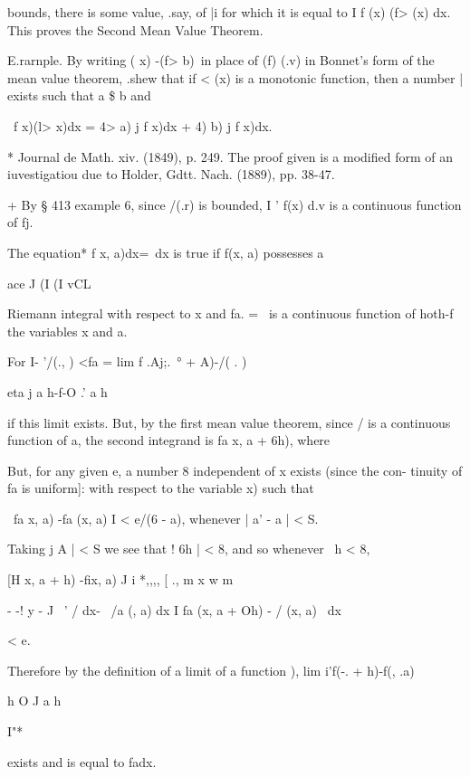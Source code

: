 bounds, there is some value, .say, of |i for which it is equal to I f
(x) (f> (x) dx. This proves the Second Mean Value Theorem.

E.rarnple. By writing ( x) -(f> b)\ in place of (f) (.v) in Bonnet's
form of the mean value theorem, .shew that if < (x) is a monotonic
function, then a number | exists such that a \$ b and

\ f x)(l> x)dx = 4> a) j f x)dx + 4) b) j f x)dx.


* Journal de Math. xiv. (1849), p. 249. The proof given is a modified
form of an iuvestigatiou due to Holder, Gdtt. Nach. (1889), pp. 38-47.

+ By § 413 example 6, since /(.r) is bounded, I ' f(x) d.v is a
continuous function of fj.

%
%


The equation* f x, a)dx=\ dx is true if f(x, a) possesses a

ace J (I (I vCL

Riemann integral with respect to x and fa. = \ is a continuous
function of hoth-f the variables x and a.

For I- '/(., ) <fa = lim f .Aj;.\ ° + A)-/( . )

eta j a h-f-O .' a h

if this limit exists. But, by the first mean value theorem, since / is
a continuous function of a, the second integrand is fa x, a + 6h),
where

But, for any given e, a number 8 independent of x exists (since the
con- tinuity of fa is uniform]: with respect to the variable x) such
that

\ fa x, a) -fa (x, a) I < e/(6 - a), whenever | a' - a | < S.

Taking j A | < S we see that ! 6h | < 8, and so whenever \ h < 8,

[H x, a + h) -fix, a) J i *,,,, [ ., m x w m

 - -! y - J \ ' / dx- \ /a (, a) dx I fa (x, a + Oh) - / (x, a) \ dx

< e.

Therefore by the definition of a limit of a function ), lim
i'f(-. + h)-f(, .a)

h O J a h

I"*

exists and is equal to fadx.

